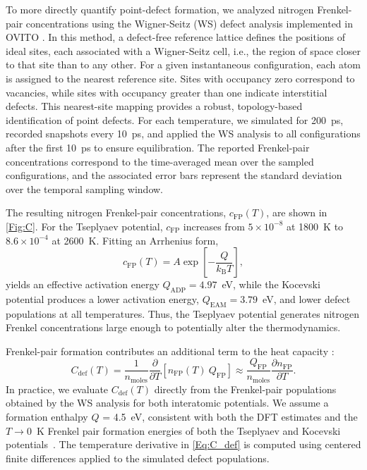 \documentclass[preprint,12pt,sort&compress]{elsarticle}
\newcommand{\?}{\stackrel{?}{=}}
\begin{document}
To more directly quantify point-defect formation, we analyzed nitrogen Frenkel-pair concentrations using the Wigner-Seitz (WS) defect analysis implemented in OVITO \cite{Stukowski2010}. In this method, a defect-free reference lattice defines the positions of ideal sites, each associated with a Wigner-Seitz cell, i.e., the region of space closer to that site than to any other. For a given instantaneous configuration, each atom is assigned to the nearest reference site. Sites with occupancy zero correspond to vacancies, while sites with occupancy greater than one indicate interstitial defects. This nearest-site mapping provides a robust, topology-based identification of point defects. For each temperature, we simulated for 200~ps, recorded snapshots every 10~ps, and applied the WS analysis to all configurations after the first 10~ps to ensure equilibration. The reported Frenkel-pair concentrations correspond to the time-averaged mean over the sampled configurations, and the associated error bars represent the standard deviation over the temporal sampling window.

The resulting nitrogen Frenkel-pair concentrations, $c_{\mathrm{FP}}(T)$, are shown in \cref{Fig:C}. For the Tseplyaev potential, $c_{\mathrm{FP}}$ increases from $5\times10^{-8}$ at 1800~K to $8.6\times10^{-4}$ at 2600~K. Fitting an Arrhenius form,
\begin{equation}
c_{\mathrm{FP}}(T) = A \exp\!\left[-\frac{Q}{k_{\mathrm{B}}T}\right],
\end{equation}
yields an effective activation energy $Q_{\mathrm{ADP}} = 4.97$~eV, while the Kocevski potential produces a lower activation energy, $Q_{\mathrm{EAM}} = 3.79$~eV, and lower defect populations at all temperatures. Thus, the Tseplyaev potential generates nitrogen Frenkel concentrations large enough to potentially alter the thermodynamics.


Frenkel-pair formation contributes an additional term to the heat capacity \cite{Szwarc1969,Pavlov2017}:
\begin{equation}
C_{\mathrm{def}}(T) = \frac{1}{n_{\mathrm{moles}}} \frac{\partial}{\partial T} \left[n_{\mathrm{FP}}(T) \ Q_\text{FP} \right]
\approx \frac{Q_\text{FP}}{n_{\mathrm{moles}}} \frac{\partial n_{\mathrm{FP}}}{\partial T}.
\label{Eq:C_def}
\end{equation}
In practice, we evaluate $C_{\mathrm{def}}(T)$ directly from the Frenkel-pair populations obtained by the WS analysis for both interatomic potentials. We assume a formation enthalpy $Q$ = 4.5~eV, consistent with both the DFT estimates \cite{Yang2021,Kocevski2022I} and the $T \rightarrow 0$~K Frenkel pair formation energies of both the Tseplyaev and Kocevski potentials~\cite{AbdulHameed2024}. The temperature derivative in \cref{Eq:C_def} is computed using centered finite differences applied to the simulated defect populations.
\end{document}
